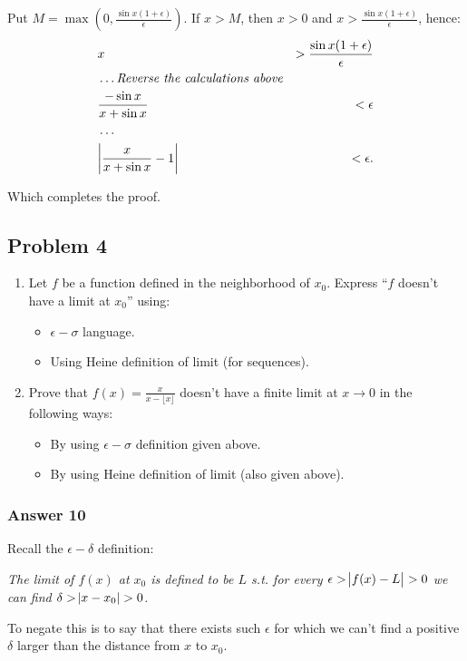 \documentclass[a4paper]{article}
\begin{document}
Put \(M = \max\left(0, \frac{\sin x(1 + \epsilon)}{\epsilon}\right)\). If \(x > M\), then
\(x > 0\) and \(x > \frac{\sin x(1 + \epsilon)}{\epsilon}\), hence:
\begin{align*}
  &x                              &> \frac{\sin x(1 + \epsilon)}{\epsilon} \\
  &\hdots \textit{Reverse the calculations above} \\
  &\frac{-\sin x}{x + \sin x}     &< \epsilon \\
  &\hdots \\
  &\abs{\frac{x}{x + \sin x} - 1} &< \epsilon.
\end{align*}

Which completes the proof.

\subsection{Problem 4}
\label{sec:orgheadline15}
\begin{enumerate}
\item Let \(f\) be a function defined in the neighborhood of \(x_0\).
Express ``\(f\) doesn't have a limit at \(x_0\)'' using:
\begin{itemize}
\item \(\epsilon-\sigma\) language.
\item Using Heine definition of limit (for sequences).
\end{itemize}

\item Prove that \(f(x) = \frac{x}{x - \lfloor x \rfloor}\) doesn't have
a finite limit at \(x \to 0\) in the following ways:
\begin{itemize}
\item By using \(\epsilon-\sigma\) definition given above.
\item By using Heine definition of limit (also given above).
\end{itemize}
\end{enumerate}

\subsubsection{Answer 10}
\label{sec:orgheadline13}
Recall the \(\epsilon-\delta\) definition:

\emph{The limit of $f(x)$ at $x_0$ is defined to be $L$ s.t. for every
  $\epsilon > \abs{f(x) - L} > 0$ we can find $\delta > \abs{x - x_0} >
  0$.}

To negate this is to say that there exists such \(\epsilon\) for which
we can't find a positive \(\delta\) larger than the distance from \(x\) to
\(x_0\).
\end{document}

